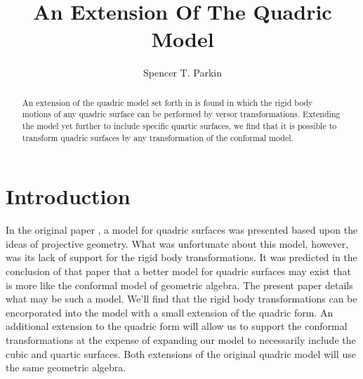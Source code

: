 \documentclass{birkjour}
\theoremstyle{definition}
\theoremstyle{remark}
\numberwithin{equation}{section}
\begin{document}
\title{An Extension Of The Quadric Model}

\author{Spencer T. Parkin}
\address{%
2113 S. Claremont Dr.\\
Bountiful, Utah  84010\\
USA}





\begin{abstract}
An extension of the quadric model set forth in \cite{Parkin12} is
found in which the rigid body motions of any quadric surface can be performed
by versor transformations.  Extending the model yet further to include
specific quartic surfaces, we find that it is possible to transform
quadric surfaces by any transformation of the conformal model.
\end{abstract}

\maketitle

\section{Introduction}


In the original paper \cite{Parkin12}, a model for quadric surfaces was
presented based upon the ideas of projective geometry.  What was unfortunate
about this model, however, was its lack of support for the rigid body transformations.  It was
predicted in the conclusion of that paper that a better model for quadric
surfaces may exist that is more like the conformal model of geometric algebra.
The present paper details what may be such a model.  We'll find that the rigid
body transformations can be encorporated into the model with a small
extension of the quadric form.  An additional extension to the quadric form
will allow us to support the conformal transformations at the expense of
expanding our model to necessarily include the cubic and quartic surfaces.  Both extensions
of the original quadric model will use the same geometric algebra.
\end{document}
